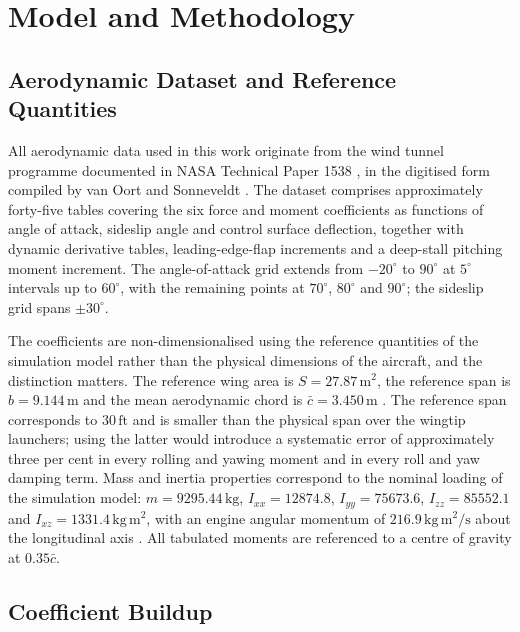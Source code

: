 \documentclass[
bindingoffset=5mm,  %
footnoteindent=3mm, %
hyphenation=true    %
]{src/wut-thesis}
\begin{document}
 
 \section{Model and Methodology}
 
 \subsection{Aerodynamic Dataset and Reference Quantities}
 
 All aerodynamic data used in this work originate from the wind tunnel
 programme documented in NASA Technical Paper 1538 \cite{nguyen1979}, in the
 digitised form compiled by van Oort and Sonneveldt \cite{vanoort2006}. The
 dataset comprises approximately forty-five tables covering the six force and
 moment coefficients as functions of angle of attack, sideslip angle and
 control surface deflection, together with dynamic derivative tables,
 leading-edge-flap increments and a deep-stall pitching moment increment. The
 angle-of-attack grid extends from $-20^{\circ}$ to $90^{\circ}$ at
 $5^{\circ}$ intervals up to $60^{\circ}$, with the remaining points at
 $70^{\circ}$, $80^{\circ}$ and $90^{\circ}$; the sideslip grid spans
 $\pm30^{\circ}$.
 
 The coefficients are non-dimensionalised using the reference quantities of
 the simulation model rather than the physical dimensions of the aircraft, and
 the distinction matters. The reference wing area is
 $S = 27.87\,\mathrm{m^{2}}$, the reference span is $b = 9.144\,\mathrm{m}$ and
 the mean aerodynamic chord is $\bar{c} = 3.450\,\mathrm{m}$
 \cite{nguyen1979,stevenslewis}. The reference span corresponds to
 $30\,\mathrm{ft}$ and is smaller than the physical span over the wingtip
 launchers; using the latter would introduce a systematic error of
 approximately three per cent in every rolling and yawing moment and in every
 roll and yaw damping term. Mass and inertia properties correspond to the
 nominal loading of the simulation model: $m = 9295.44\,\mathrm{kg}$,
 $I_{xx} = 12874.8$, $I_{yy} = 75673.6$, $I_{zz} = 85552.1$ and
 $I_{xz} = 1331.4\,\mathrm{kg\,m^{2}}$, with an engine angular momentum of
 $216.9\,\mathrm{kg\,m^{2}/s}$ about the longitudinal axis
 \cite{stevenslewis}. All tabulated moments are referenced to a centre of
 gravity at $0.35\bar{c}$.
 
 \subsection{Coefficient Buildup}
 
\end{document}
